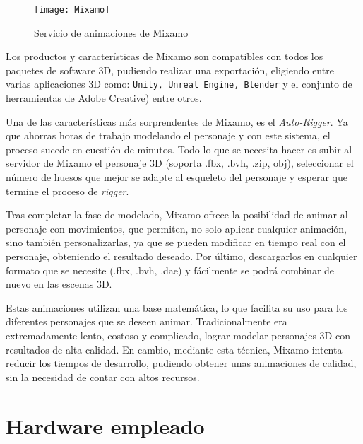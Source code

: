 \begin{figure}[h]
    \centering 
    \texttt{[image: Mixamo]}
    \caption{Servicio de animaciones de Mixamo}
    \label{fig:Mixamo} 
\end{figure} 

Los productos y características de Mixamo son compatibles con todos los paquetes de software 3D, pudiendo realizar una exportación, eligiendo entre varias aplicaciones 3D como: \texttt{Unity, Unreal Engine, Blender} y el conjunto de herramientas de Adobe Creative) entre otros.

Una de las características más sorprendentes de Mixamo, es el \textit{Auto-Rigger}. Ya que ahorras horas de trabajo modelando el personaje y con este sistema, el proceso sucede en cuestión de minutos. Todo lo que se necesita hacer es subir al servidor de Mixamo el personaje 3D (soporta .fbx, .bvh, .zip, obj), seleccionar el número de huesos que mejor se adapte al esqueleto del personaje y esperar que termine el proceso de \textit{rigger}.
\vspace{0.4cm}

Tras completar la fase de modelado, Mixamo ofrece la posibilidad de animar al personaje con movimientos, que permiten, no solo aplicar cualquier animación, sino también personalizarlas, ya que se pueden modificar en tiempo real con el personaje, obteniendo el resultado deseado. Por último, descargarlos en cualquier formato que se necesite (.fbx, .bvh, .dae) y fácilmente se podrá combinar de nuevo en las escenas 3D.
\vspace{0.4cm}

Estas animaciones utilizan una base matemática, lo que facilita su uso para los diferentes personajes que se deseen animar. Tradicionalmente era extremadamente lento, costoso y complicado, lograr modelar personajes 3D con resultados de alta calidad. En cambio, mediante esta técnica, Mixamo intenta reducir los tiempos de desarrollo, pudiendo obtener unas animaciones de calidad, sin la necesidad de contar con altos recursos. 

\section{Hardware empleado}
\label{cap4:sec:hardware empleado}